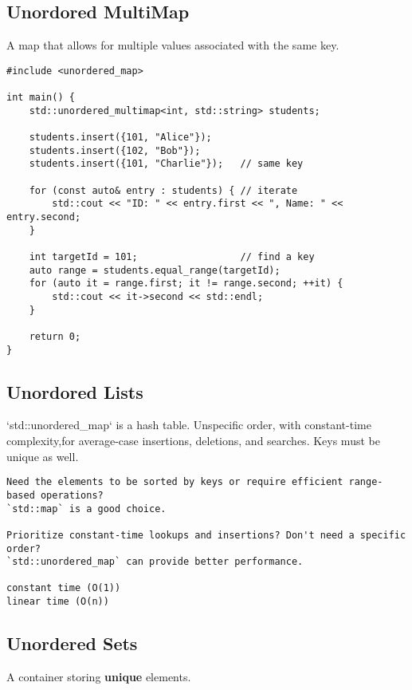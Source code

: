\documentclass[openany]{report}
\begin{document}
\subsection{Unordored MultiMap}

A map that allows for multiple values associated with the same key. 

\begin{verbatim}
#include <unordered_map>

int main() {
    std::unordered_multimap<int, std::string> students;

    students.insert({101, "Alice"});
    students.insert({102, "Bob"});
    students.insert({101, "Charlie"});   // same key

    for (const auto& entry : students) { // iterate 
        std::cout << "ID: " << entry.first << ", Name: " << entry.second;
    }

    int targetId = 101;                  // find a key
    auto range = students.equal_range(targetId);
    for (auto it = range.first; it != range.second; ++it) { 
        std::cout << it->second << std::endl;
    }

    return 0;
}
\end{verbatim}

\subsection{Unordored Lists}

`std::unordered\_map` is a hash table. 
Unspecific order, with constant-time complexity,for average-case 
insertions, deletions, and searches. 
Keys must be unique as well.

\begin{verbatim}
Need the elements to be sorted by keys or require efficient range-based operations?
`std::map` is a good choice.

Prioritize constant-time lookups and insertions? Don't need a specific order? 
`std::unordered_map` can provide better performance.

constant time (O(1)) 
linear time (O(n))
\end{verbatim}

\subsection{Unordered Sets}

A container storing \textbf{unique} elements.
\end{document}
